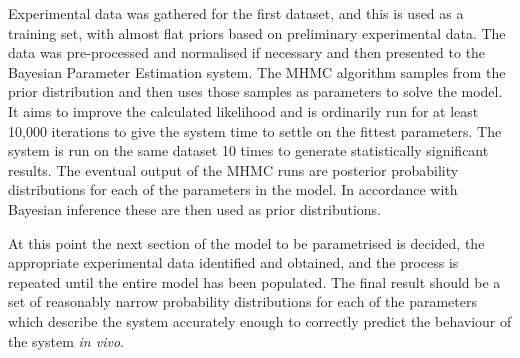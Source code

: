 Experimental data was gathered for the first dataset, and this is used as a training set, with almost flat priors based on preliminary experimental data. The data was pre-processed and normalised if necessary and then presented to the Bayesian Parameter Estimation system. The MHMC algorithm samples from the prior distribution and then uses those samples as parameters to solve the model. It aims to improve the calculated likelihood and is ordinarily run for at least 10,000 iterations to give the system time to settle on the fittest parameters. The system is run on the same dataset 10 times to generate statistically significant results. The eventual output of the MHMC runs are posterior probability distributions for each of the parameters in the model. In accordance with Bayesian inference these are then used as prior distributions.

At this point the next section of the model to be parametrised is decided, the appropriate experimental data identified and obtained, and the process is repeated until the entire model has been populated. The final result should be a set of reasonably narrow probability distributions for each of the parameters which describe the system accurately enough to correctly predict the behaviour of the system \textit{in vivo}.